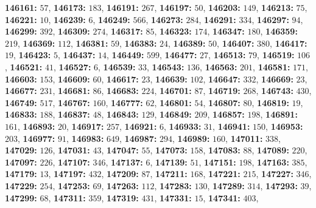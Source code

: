 \textsf{\bfseries 146161:} $57$, \textsf{\bfseries 146173:} $183$, \textsf{\bfseries 146191:} $267$, \textsf{\bfseries 146197:} $50$, \textsf{\bfseries 146203:} $149$, \textsf{\bfseries 146213:} $75$, \textsf{\bfseries 146221:} $10$, \textsf{\bfseries 146239:} $6$, \textsf{\bfseries 146249:} $566$, \textsf{\bfseries 146273:} $284$, \textsf{\bfseries 146291:} $334$, \textsf{\bfseries 146297:} $94$, \textsf{\bfseries 146299:} $392$, \textsf{\bfseries 146309:} $274$, \textsf{\bfseries 146317:} $85$, \textsf{\bfseries 146323:} $174$, \textsf{\bfseries 146347:} $180$, \textsf{\bfseries 146359:} $219$, \textsf{\bfseries 146369:} $112$, \textsf{\bfseries 146381:} $59$, \textsf{\bfseries 146383:} $24$, \textsf{\bfseries 146389:} $50$, \textsf{\bfseries 146407:} $380$, \textsf{\bfseries 146417:} $19$, \textsf{\bfseries 146423:} $5$, \textsf{\bfseries 146437:} $14$, \textsf{\bfseries 146449:} $599$, \textsf{\bfseries 146477:} $27$, \textsf{\bfseries 146513:} $79$, \textsf{\bfseries 146519:} $106$, \textsf{\bfseries 146521:} $41$, \textsf{\bfseries 146527:} $6$, \textsf{\bfseries 146539:} $33$, \textsf{\bfseries 146543:} $136$, \textsf{\bfseries 146563:} $201$, \textsf{\bfseries 146581:} $171$, \textsf{\bfseries 146603:} $153$, \textsf{\bfseries 146609:} $60$, \textsf{\bfseries 146617:} $23$, \textsf{\bfseries 146639:} $102$, \textsf{\bfseries 146647:} $332$, \textsf{\bfseries 146669:} $23$, \textsf{\bfseries 146677:} $231$, \textsf{\bfseries 146681:} $86$, \textsf{\bfseries 146683:} $224$, \textsf{\bfseries 146701:} $87$, \textsf{\bfseries 146719:} $268$, \textsf{\bfseries 146743:} $430$, \textsf{\bfseries 146749:} $517$, \textsf{\bfseries 146767:} $160$, \textsf{\bfseries 146777:} $62$, \textsf{\bfseries 146801:} $54$, \textsf{\bfseries 146807:} $80$, \textsf{\bfseries 146819:} $19$, \textsf{\bfseries 146833:} $188$, \textsf{\bfseries 146837:} $48$, \textsf{\bfseries 146843:} $129$, \textsf{\bfseries 146849:} $209$, \textsf{\bfseries 146857:} $198$, \textsf{\bfseries 146891:} $161$, \textsf{\bfseries 146893:} $20$, \textsf{\bfseries 146917:} $257$, \textsf{\bfseries 146921:} $6$, \textsf{\bfseries 146933:} $31$, \textsf{\bfseries 146941:} $150$, \textsf{\bfseries 146953:} $203$, \textsf{\bfseries 146977:} $91$, \textsf{\bfseries 146983:} $649$, \textsf{\bfseries 146987:} $294$, \textsf{\bfseries 146989:} $160$, \textsf{\bfseries 147011:} $338$, \textsf{\bfseries 147029:} $126$, \textsf{\bfseries 147031:} $43$, \textsf{\bfseries 147047:} $55$, \textsf{\bfseries 147073:} $158$, \textsf{\bfseries 147083:} $88$, \textsf{\bfseries 147089:} $220$, \textsf{\bfseries 147097:} $226$, \textsf{\bfseries 147107:} $346$, \textsf{\bfseries 147137:} $6$, \textsf{\bfseries 147139:} $51$, \textsf{\bfseries 147151:} $198$, \textsf{\bfseries 147163:} $385$, \textsf{\bfseries 147179:} $13$, \textsf{\bfseries 147197:} $432$, \textsf{\bfseries 147209:} $87$, \textsf{\bfseries 147211:} $168$, \textsf{\bfseries 147221:} $215$, \textsf{\bfseries 147227:} $346$, \textsf{\bfseries 147229:} $254$, \textsf{\bfseries 147253:} $69$, \textsf{\bfseries 147263:} $112$, \textsf{\bfseries 147283:} $130$, \textsf{\bfseries 147289:} $314$, \textsf{\bfseries 147293:} $39$, \textsf{\bfseries 147299:} $68$, \textsf{\bfseries 147311:} $359$, \textsf{\bfseries 147319:} $431$, \textsf{\bfseries 147331:} $15$, \textsf{\bfseries 147341:} $403$, 
